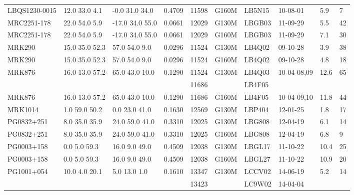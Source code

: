 \documentclass[iop]{emulateapj-rtx4}
\begin{document}
\begin{table}[ht]
\begin{center}
\begin{tabular}{l l l l l l l l l l}
LBQS1230-0015  	 &   12.0  33.0  4.1  &    -0.0  31.0  34.0    &    0.4709  & 11598  		    &   G160M  &   LB5N15			& 10-08-01		   &  5.9   &       7          \\
MRC2251-178  	 &   22.0  54.0  5.9  &    -17.0  34.0  55.0  &   0.0661   & 12029  		    &   G130M  &   LBGB03                 & 11-09-29                   &  5.5   &      42         \\
MRC2251-178  	 &   22.0  54.0  5.9  &    -17.0  34.0  55.0  &   0.0661   & 12029  		    &   G160M  &   LBGB03                 & 11-09-29                   &  7.1   &      30         \\
MRK290  			&  15.0  35.0  52.3  &     57.0  54.0  9.0    &    0.0296  & 11524		    &   G130M  &   LB4Q02   		& 09-10-28  		   &   3.9  &      38         \\
MRK290  			&  15.0  35.0  52.3  &     57.0  54.0  9.0    &    0.0296  & 11524		    &   G160M  &   LB4Q02   		& 09-10-28  		   &   4.8  &      18         \\
MRK876  			&  16.0  13.0  57.2  &    65.0  43.0  10.0   &    0.1290  & 11524		    &   G130M  &   LB4Q03			& 10-04-08,09  		   & 12.6  &      65         \\
				 &			      &				       &		 & 11686		    &		      &   LB4F05			&				   &	       &	  	   \\

MRK876  			&  16.0  13.0  57.2  &    65.0  43.0  10.0   &    0.1290  & 11686               &   G160M  &   LB4F05		        & 10-04-09,10  		   & 11.8  &      44         \\
MRK1014  		&    1.0  59.0  50.2  &    0.0  23.0  41.0     &    0.1630  & 12569  		    &   G130M  &   LBP404   	 	& 12-01-25  		   &  1.8   &      17         \\
PG0832+251  		&    8.0  35.0  35.9  &    24.0  59.0  41.0   &    0.3310  & 12025  		    &   G130M  &   LBG808			& 12-04-19		   &  6.1   &      14         \\
PG0832+251  		&    8.0  35.0  35.9  &    24.0  59.0  41.0   &    0.3310  & 12025  		    &   G160M  &   LBG808			& 12-04-19		   &  6.8   &       9          \\
PG0003+158  		&     0.0  5.0  59.3   &     16.0  9.0  49.0    &    0.4509  & 12038  		    &   G130M  &   LBGL17  		& 11-10-22  		   & 10.4  &      25         \\
PG0003+158  		&     0.0  5.0  59.3   &     16.0  9.0  49.0    &    0.4509  & 12038  		    &   G160M  &   LBGL27  		& 11-10-22  		   & 10.9  &      20         \\
PG1001+054  		&    10.0  4.0  20.1  &       5.0  13.0  1.0    &    0.1610  & 13347		    &   G130M  &   LCCV02 		& 14-06-19  		   &  5.2   &      14         \\
				&			      &				       &		 & 13423		    &		      &   LC9W02		& 14-04-04		   &	       &	  	   \\


\end{tabular}
\end{center}
\end{table}
\end{document}

